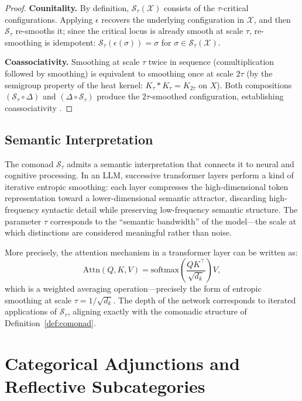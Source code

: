 \documentclass[a4paper,12pt]{article}
\theoremstyle{definition}
\newcommand{\Stau}{\mathcal{S}_\tau}
\newcommand{\X}{\mathcal{X}}
\begin{document}
\begin{proof}
\textbf{Counitality.} By definition, $\Stau(\X)$ consists of the $\tau$-critical configurations. Applying $\epsilon$ recovers the underlying configuration in $\X$, and then $\Stau$ re-smooths it; since the critical locus is already smooth at scale $\tau$, re-smoothing is idempotent: $\Stau(\epsilon(\sigma)) = \sigma$ for $\sigma \in \Stau(\X)$.

\textbf{Coassociativity.} Smoothing at scale $\tau$ twice in sequence (comultiplication followed by smoothing) is equivalent to smoothing once at scale $2\tau$ (by the semigroup property of the heat kernel: $K_\tau * K_\tau = K_{2\tau}$ on $X$). Both compositions $(\Stau \circ \Delta)$ and $(\Delta \circ \Stau)$ produce the $2\tau$-smoothed configuration, establishing coassociativity \cite{MacLane1998}.
\end{proof}

\subsection{Semantic Interpretation}

The comonad $\Stau$ admits a semantic interpretation that connects it to neural and cognitive processing. In an LLM, successive transformer layers perform a kind of iterative entropic smoothing: each layer compresses the high-dimensional token representation toward a lower-dimensional semantic attractor, discarding high-frequency syntactic detail while preserving low-frequency semantic structure. The parameter $\tau$ corresponds to the ``semantic bandwidth'' of the model—the scale at which distinctions are considered meaningful rather than noise.

More precisely, the attention mechanism in a transformer layer can be written as:
\[
\mathrm{Attn}(Q, K, V) = \mathrm{softmax}\!\left(\frac{QK^\top}{\sqrt{d_k}}\right) V,
\]
which is a weighted averaging operation—precisely the form of entropic smoothing at scale $\tau = 1/\sqrt{d_k}$. The depth of the network corresponds to iterated applications of $\Stau$, aligning exactly with the comonadic structure of Definition~\ref{def:comonad}.

\section{Categorical Adjunctions and Reflective Subcategories}
\label{sec:adjunction}
\end{document}
